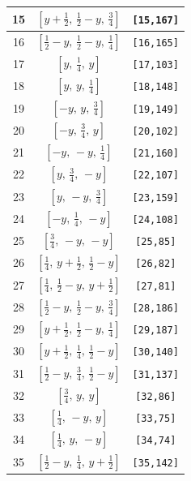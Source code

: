 \documentclass[fleqn,8pt]{jsarticle}
\begin{document}
\begin{longtable}{ccc}
15 & $\left[ y + \frac{1}{2},\, \frac{1}{2} - y,\, \frac{3}{4} \right]$ & {\tt [15,167]} \\ \hline
16 & $\left[ \frac{1}{2} - y,\, \frac{1}{2} - y,\, \frac{1}{4} \right]$ & {\tt [16,165]} \\ \hline
17 & $\left[ y,\, \frac{1}{4},\, y \right]$ & {\tt [17,103]} \\ \hline
18 & $\left[ y,\, y,\, \frac{1}{4} \right]$ & {\tt [18,148]} \\ \hline
19 & $\left[ - y,\, y,\, \frac{3}{4} \right]$ & {\tt [19,149]} \\ \hline
20 & $\left[ - y,\, \frac{3}{4},\, y \right]$ & {\tt [20,102]} \\ \hline
21 & $\left[ - y,\, - y,\, \frac{1}{4} \right]$ & {\tt [21,160]} \\ \hline
22 & $\left[ y,\, \frac{3}{4},\, - y \right]$ & {\tt [22,107]} \\ \hline
23 & $\left[ y,\, - y,\, \frac{3}{4} \right]$ & {\tt [23,159]} \\ \hline
24 & $\left[ - y,\, \frac{1}{4},\, - y \right]$ & {\tt [24,108]} \\ \hline
25 & $\left[ \frac{3}{4},\, - y,\, - y \right]$ & {\tt [25,85]} \\ \hline
26 & $\left[ \frac{1}{4},\, y + \frac{1}{2},\, \frac{1}{2} - y \right]$ & {\tt [26,82]} \\ \hline
27 & $\left[ \frac{1}{4},\, \frac{1}{2} - y,\, y + \frac{1}{2} \right]$ & {\tt [27,81]} \\ \hline
28 & $\left[ \frac{1}{2} - y,\, \frac{1}{2} - y,\, \frac{3}{4} \right]$ & {\tt [28,186]} \\ \hline
29 & $\left[ y + \frac{1}{2},\, \frac{1}{2} - y,\, \frac{1}{4} \right]$ & {\tt [29,187]} \\ \hline
30 & $\left[ y + \frac{1}{2},\, \frac{1}{4},\, \frac{1}{2} - y \right]$ & {\tt [30,140]} \\ \hline
31 & $\left[ \frac{1}{2} - y,\, \frac{3}{4},\, \frac{1}{2} - y \right]$ & {\tt [31,137]} \\ \hline
32 & $\left[ \frac{3}{4},\, y,\, y \right]$ & {\tt [32,86]} \\ \hline
33 & $\left[ \frac{1}{4},\, - y,\, y \right]$ & {\tt [33,75]} \\ \hline
34 & $\left[ \frac{1}{4},\, y,\, - y \right]$ & {\tt [34,74]} \\ \hline
35 & $\left[ \frac{1}{2} - y,\, \frac{1}{4},\, y + \frac{1}{2} \right]$ & {\tt [35,142]} \\ \hline

\end{longtable}
\end{document}
